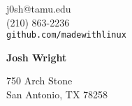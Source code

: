\documentclass[12pt]{article}
\begin{document}
\noindent
\sffamily

\begin{minipage}{0.3\linewidth}
\begin{flushleft}
j0sh@tamu.edu\\
(210) 863-2236\\
\verb|github.com/madewithlinux|
\end{flushleft}
\end{minipage}
\hfill
\begin{minipage}{0.3\linewidth}
\begin{center}
{\Huge\textbf{Josh Wright}}
\end{center}
\end{minipage}
\hfill
\begin{minipage}{0.3\linewidth}
\begin{flushright}
750 Arch Stone\\
San Antonio, TX 78258
\end{flushright}
\end{minipage}
\end{document}
